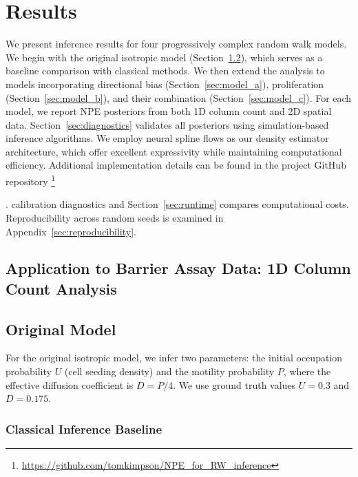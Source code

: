 \documentclass{article}
\providecommand{\DIFaddtex}[1]{{\protect\color{blue} \sf #1}} %
\providecommand{\DIFdeltex}[1]{{\protect\color{red} \scriptsize #1}} %
\providecommand{\DIFaddbegin}{} %
\providecommand{\DIFaddend}{} %
\providecommand{\DIFdelbegin}{} %
\providecommand{\DIFdelend}{} %
\providecommand{\DIFadd}[1]{\texorpdfstring{\DIFaddtex{#1}}{#1}} %
\providecommand{\DIFdel}[1]{\texorpdfstring{\DIFdeltex{#1}}{}} %
\newcommand{\DIFscaledelfig}{0.5}
\newlength{\DIFdelgraphicswidth} %
\newlength{\DIFdelgraphicsheight} %
\newcommand{\DIFaddincludegraphics}[2][]{{\color{blue}\fbox{\DIFOincludegraphics[#1]{#2}}}} %
\newcommand{\DIFdelincludegraphics}[2][]{%
\sbox{\DIFdelgraphicsbox}{\DIFOincludegraphics[#1]{#2}}%
\settoboxwidth{\DIFdelgraphicswidth}{\DIFdelgraphicsbox} %
\settoboxtotalheight{\DIFdelgraphicsheight}{\DIFdelgraphicsbox} %
\scalebox{\DIFscaledelfig}{%
\parbox[b]{\DIFdelgraphicswidth}{\usebox{\DIFdelgraphicsbox}\\[-\baselineskip] \rule{\DIFdelgraphicswidth}{0em}}\llap{\resizebox{\DIFdelgraphicswidth}{\DIFdelgraphicsheight}{%
\setlength{\unitlength}{\DIFdelgraphicswidth}%
\begin{picture}(1,1)%
\thicklines\linethickness{2pt} %
{\color[rgb]{1,0,0}\put(0,0){\framebox(1,1){}}}%
{\color[rgb]{1,0,0}\put(0,0){\line( 1,1){1}}}%
{\color[rgb]{1,0,0}\put(0,1){\line(1,-1){1}}}%
\end{picture}%
}\hspace*{3pt}}} %
} %
\DeclareRobustCommand{\DIFaddbegin}{\DIFOaddbegin \let\includegraphics\DIFaddincludegraphics} %
\DeclareRobustCommand{\DIFaddend}{\DIFOaddend \let\includegraphics\DIFOincludegraphics} %
\DeclareRobustCommand{\DIFdelbegin}{\DIFOdelbegin \let\includegraphics\DIFdelincludegraphics} %
\DeclareRobustCommand{\DIFdelend}{\DIFOaddend \let\includegraphics\DIFOincludegraphics} %
\begin{document}
\section{\DIFadd{Results}}\label{sec:results}

\DIFadd{We present inference results for four progressively complex random walk models. We begin with the original isotropic model (Section~\ref{sec:original_model}), which serves as a baseline comparison with classical methods. We then extend the analysis to models incorporating directional bias (Section~\ref{sec:model_a}), proliferation (Section~\ref{sec:model_b}), and their combination (Section~\ref{sec:model_c}). For each model, we report NPE posteriors from both 1D column count and 2D spatial data. Section~\ref{sec:diagnostics} validates all posteriors using }\DIFaddend simulation-based \DIFdelbegin \DIFdel{inference algorithms. We employ neural spline flows \cite{durkan2019neural} as our density estimator architecture, which offer excellent expressivity while maintaining computational efficiency. Additional implementation details can be found in the project GitHub repository }\footnote{\href{github.com/tomkimpson/NPE_for_RW_inference}{\DIFdel{https://github.com/tomkimpson/NPE\_for\_RW\_inference}}%
}%
\addtocounter{footnote}{-1}%
\DIFdel{. }\DIFdelend \DIFaddbegin \DIFadd{calibration diagnostics and Section~\ref{sec:runtime} compares computational costs. Reproducibility across random seeds is examined in Appendix~\ref{sec:reproducibility}.
}\DIFaddend 

\DIFdelbegin \subsection{\DIFdel{Application to Barrier Assay Data: 1D Column Count Analysis}} %
\addtocounter{subsection}{-1}%
\DIFdelend \DIFaddbegin \subsection{\DIFadd{Original Model}}\label{sec:original_model}

\DIFadd{For the original isotropic model, we infer two parameters: the initial occupation probability $U$ (cell seeding density) and the motility probability $P$, where the effective diffusion coefficient is $D = P/4$. We use ground truth values $U=0.3$ and $D=0.175$.
}

\subsubsection{\DIFadd{Classical Inference Baseline}}\label{sec:results_classical}
\end{document}
